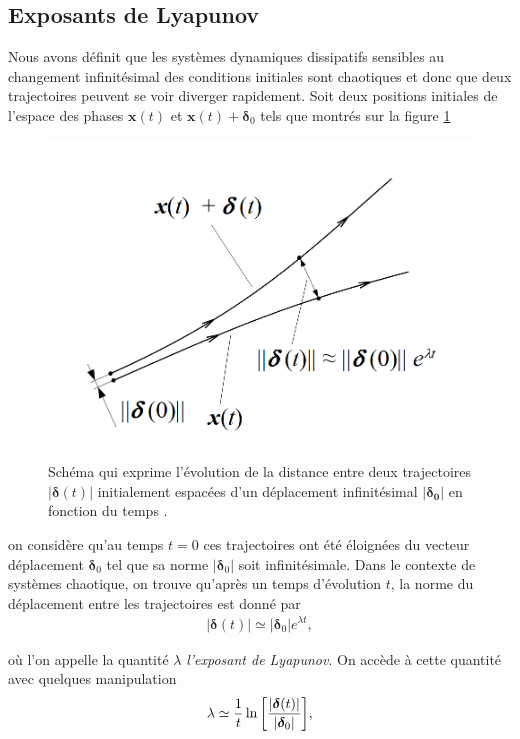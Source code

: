 \subsection{Exposants de Lyapunov} \label{subsec: lyapunov}
    Nous avons définit que les systèmes dynamiques dissipatifs sensibles au changement infinitésimal des conditions initiales sont chaotiques et donc que deux trajectoires peuvent se voir diverger rapidement. Soit deux positions initiales de l'espace des phases $\bm{x}(t)$ et $\bm{x}(t) + \bm{\delta}_0$ tels que montrés sur la figure \ref{fig: theo_lyapunov}
    \begin{figure}[h!]
        \centering
        \includegraphics[scale=0.3]{figs/Orbital_instability_(Lyapunov_exponent).png}
        \caption{Schéma qui exprime l'évolution de la distance entre deux trajectoires $|\bm{\delta}(t)|$ initialement espacées d'un déplacement infinitésimal $|\bm{\delta_0}|$ en fonction du temps \cite{LEs_wiki}.}
        \label{fig: theo_lyapunov}
    \end{figure}
    
    on considère qu'au temps $t=0$ ces trajectoires ont été éloignées du vecteur déplacement $\bm{\delta}_0$ tel que sa norme $|\bm{\delta}_0|$ soit infinitésimale. Dans le contexte de systèmes chaotique, on trouve qu'après un temps d'évolution $t$, la norme du déplacement entre les trajectoires est donné par
    \begin{align}
        |\bm{\delta}(t)| \simeq |\bm{\delta}_0|e^{\lambda t},
        \label{eq : lyapunov_delta}
    \end{align}

    où l'on appelle la quantité $\lambda$ \textit{l'exposant de Lyapunov}. On accède à cette quantité avec quelques manipulation
    \begin{align}
        \lambda \simeq \frac{1}{t}\ln\qty[\frac{|\bm{\delta}(t)|}{|\bm{\delta}_0|}],
    \end{align}


